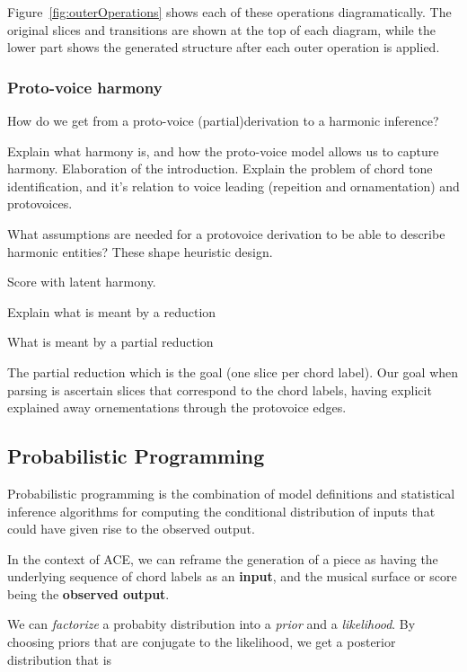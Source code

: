 \documentclass[12pt,a4paper,twoside,openright]{report}
\theoremstyle{definition}
\begin{document}
Figure~\ref{fig:outerOperations} shows each of these operations diagramatically. The original slices and transitions are shown at the top of each diagram, while the lower part shows the generated structure after each outer operation is applied.

\FloatBarrier
\subsubsection{Proto-voice harmony}

How do we get from a proto-voice (partial)derivation to a harmonic inference?
\par
Explain what harmony is, and how the proto-voice model allows us to capture harmony. Elaboration of the introduction. Explain the problem of chord tone identification, and it's relation to voice leading (repeition and ornamentation) and protovoices.
\par
What assumptions are needed for a protovoice derivation to be able to describe harmonic entities? These shape heuristic design.
\par
Score with latent harmony. 
\par
Explain what is meant by a reduction 
\par 
What is meant by a partial reduction
\par 
The partial reduction which is the goal (one slice per chord label). Our goal when parsing is ascertain slices that correspond to the chord labels, having explicit explained away ornementations through the protovoice edges. 

\subsection{Probabilistic Programming}
Probabilistic programming is the combination of model definitions and statistical inference algorithms for computing the conditional distribution of inputs that could have given rise to the observed output. 
\par 
In the context of ACE, we can reframe the generation of a piece as having the underlying sequence of chord labels as an \textbf{input}, and the musical surface or score being the \textbf{observed output}. 
\par 

We can \textit{factorize} a probabity distribution into a \textit{prior} and a \textit{likelihood}. By choosing priors that are conjugate to the likelihood, we get a posterior distribution that is 
\end{document}
